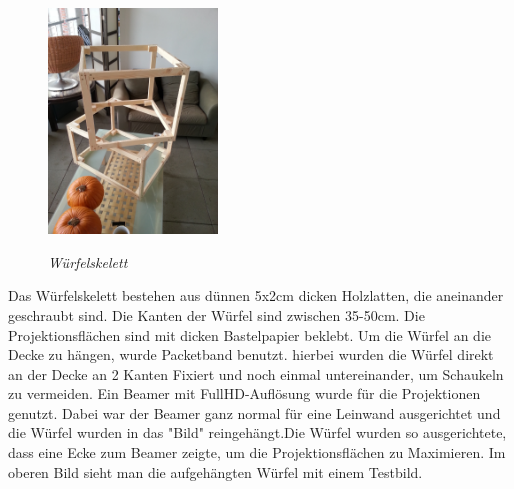 \documentclass[pdftex,12pt,a4paper]{report}
\begin{document}
\begin{figure} %
\centering
\includegraphics[width=0.4\textwidth]{./wuerfel_skelett}\\[0.3cm]   
\begin{flushright}
\textit{Würfelskelett}
\end{flushright}
\end{figure}
Das Würfelskelett bestehen aus dünnen 5x2cm dicken Holzlatten, die aneinander geschraubt sind.
Die Kanten der Würfel sind zwischen 35-50cm.  Die Projektionsflächen sind mit dicken Bastelpapier beklebt. Um die Würfel an die Decke zu hängen, wurde Packetband benutzt. hierbei wurden die Würfel direkt an der Decke an 2 Kanten Fixiert und noch einmal untereinander, um Schaukeln zu vermeiden.
Ein Beamer mit FullHD-Auflösung wurde für die Projektionen genutzt. Dabei war der Beamer ganz normal für eine Leinwand ausgerichtet und die Würfel wurden in das "Bild" reingehängt.Die Würfel wurden so ausgerichtete, dass eine Ecke zum Beamer zeigte, um die Projektionsflächen zu Maximieren.
Im oberen Bild sieht man die aufgehängten Würfel mit einem Testbild. 
\end{document}

